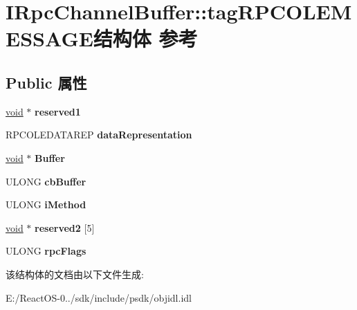 \hypertarget{struct_i_rpc_channel_buffer_1_1tag_r_p_c_o_l_e_m_e_s_s_a_g_e}{}\section{I\+Rpc\+Channel\+Buffer\+:\+:tag\+R\+P\+C\+O\+L\+E\+M\+E\+S\+S\+A\+G\+E结构体 参考}
\label{struct_i_rpc_channel_buffer_1_1tag_r_p_c_o_l_e_m_e_s_s_a_g_e}
\subsection*{Public 属性}
\begin{DoxyCompactItemize}
\item 
\mbox{\label{struct_i_rpc_channel_buffer_1_1tag_r_p_c_o_l_e_m_e_s_s_a_g_e_a809f939bca9066d1c44f2c874894b008}} 
\hyperlink{interfacevoid}{void} $\ast$ {\bfseries reserved1}
\item 
\mbox{\label{struct_i_rpc_channel_buffer_1_1tag_r_p_c_o_l_e_m_e_s_s_a_g_e_a7b5260e390a53457707aead5047f7540}} 
R\+P\+C\+O\+L\+E\+D\+A\+T\+A\+R\+EP {\bfseries data\+Representation}
\item 
\mbox{\label{struct_i_rpc_channel_buffer_1_1tag_r_p_c_o_l_e_m_e_s_s_a_g_e_a5ecf908afac7ccdefd9566812131827c}} 
\hyperlink{interfacevoid}{void} $\ast$ {\bfseries Buffer}
\item 
\mbox{\label{struct_i_rpc_channel_buffer_1_1tag_r_p_c_o_l_e_m_e_s_s_a_g_e_a40a8094a6f39c43efa1e1380d119ba6a}} 
U\+L\+O\+NG {\bfseries cb\+Buffer}
\item 
\mbox{\label{struct_i_rpc_channel_buffer_1_1tag_r_p_c_o_l_e_m_e_s_s_a_g_e_a05965615b45c7afebe0a93dc084aed99}} 
U\+L\+O\+NG {\bfseries i\+Method}
\item 
\mbox{\label{struct_i_rpc_channel_buffer_1_1tag_r_p_c_o_l_e_m_e_s_s_a_g_e_afa9a3fc21c052db58cd1e356cf307657}} 
\hyperlink{interfacevoid}{void} $\ast$ {\bfseries reserved2} \mbox{[}5\mbox{]}
\item 
\mbox{\label{struct_i_rpc_channel_buffer_1_1tag_r_p_c_o_l_e_m_e_s_s_a_g_e_a5b9a1ca951239d65646a9f7b51568259}} 
U\+L\+O\+NG {\bfseries rpc\+Flags}
\end{DoxyCompactItemize}


该结构体的文档由以下文件生成\+:\begin{DoxyCompactItemize}
\item 
E\+:/\+React\+O\+S-\/0../sdk/include/psdk/objidl.\+idl\end{DoxyCompactItemize}
